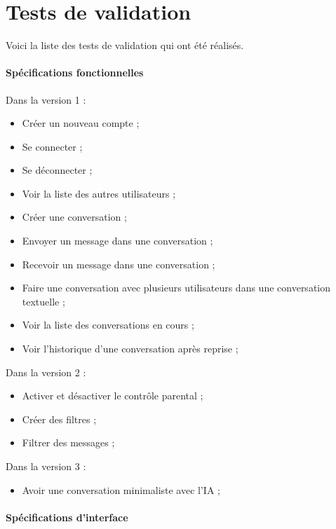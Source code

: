  


\section{Tests de validation}

Voici la liste des tests de validation qui ont été réalisés. \\


\paragraph{Spécifications fonctionnelles\\} 

Dans la version 1 :
\begin{itemize}
	\item Créer un nouveau compte ;
	\item Se connecter ;
	\item Se déconnecter ;
	\item Voir la liste des autres utilisateurs ;
	\item Créer une conversation ;
	\item Envoyer un message dans une conversation ;
	\item Recevoir un message dans une conversation ;
	\item Faire une conversation avec plusieurs utilisateurs dans une conversation textuelle ;
	\item Voir la liste des conversations en cours ;
	\item Voir l'historique d'une conversation après reprise ; \\
\end{itemize}

Dans la version 2 :
\begin{itemize}
	\item Activer et désactiver le contrôle parental ;
	\item Créer des filtres ;
	\item Filtrer des messages ; \\
\end{itemize}

Dans la version 3 :
\begin{itemize}
	\item Avoir une conversation minimaliste avec l'IA ;
\end{itemize}

\paragraph{Spécifications d'interface \\}

